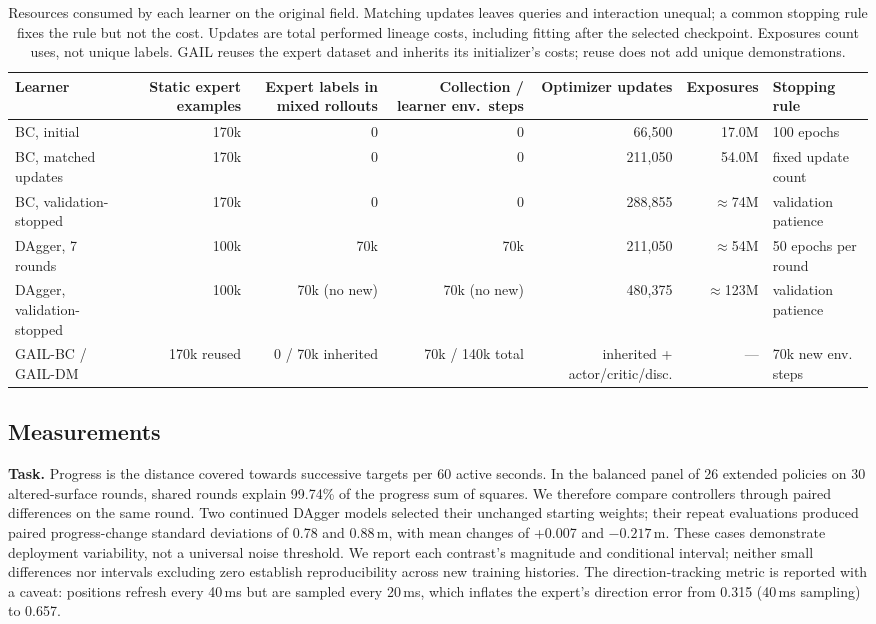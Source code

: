 \documentclass[conference]{IEEEtran}
\begin{document}
\begin{table}[t]\centering\small
\caption{Resources consumed by each learner on the original field. Matching updates leaves queries and interaction unequal; a common stopping rule fixes the rule but not the cost. Updates are total performed lineage costs, including fitting after the selected checkpoint. Exposures count uses, not unique labels. GAIL reuses the expert dataset and inherits its initializer's costs; reuse does not add unique demonstrations.}
\label{tab:resources}
\begin{tabularx}{\textwidth}{lRRRRRX}\toprule
Learner & Static expert examples & Expert labels in mixed rollouts & Collection / learner env.\ steps & Optimizer updates & Exposures & Stopping rule \\
\midrule
BC, initial & 170k & 0 & 0 & 66,500 & 17.0M & 100 epochs \\
BC, matched updates & 170k & 0 & 0 & 211,050 & 54.0M & fixed update count \\
BC, validation-stopped & 170k & 0 & 0 & 288,855 & $\approx$74M & validation patience \\
DAgger, 7 rounds & 100k & 70k & 70k & 211,050 & $\approx$54M & 50 epochs per round \\
DAgger, validation-stopped & 100k & 70k (no new) & 70k (no new) & 480,375 & $\approx$123M & validation patience \\
GAIL-BC / GAIL-DM & 170k reused & 0 / 70k inherited & 70k / 140k total & inherited + actor/critic/disc. & --- & 70k new env. steps \\
\bottomrule\end{tabularx}
\end{table}

\subsection{Measurements}
\label{sec:measurement}
\textbf{Task.} Progress is the distance covered towards successive targets per 60 active seconds. In the balanced panel of 26 extended policies on 30 altered-surface rounds, shared rounds explain 99.74\% of the progress sum of squares. We therefore compare controllers through paired differences on the same round. Two continued DAgger models selected their unchanged starting weights; their repeat evaluations produced paired progress-change standard deviations of 0.78 and 0.88\,m, with mean changes of +0.007 and $-0.217$\,m. These cases demonstrate deployment variability, not a universal noise threshold. We report each contrast's magnitude and conditional interval; neither small differences nor intervals excluding zero establish reproducibility across new training histories. The direction-tracking metric is reported with a caveat: positions refresh every 40\,ms but are sampled every 20\,ms, which inflates the expert's direction error from 0.315 (40\,ms sampling) to 0.657.
\end{document}
